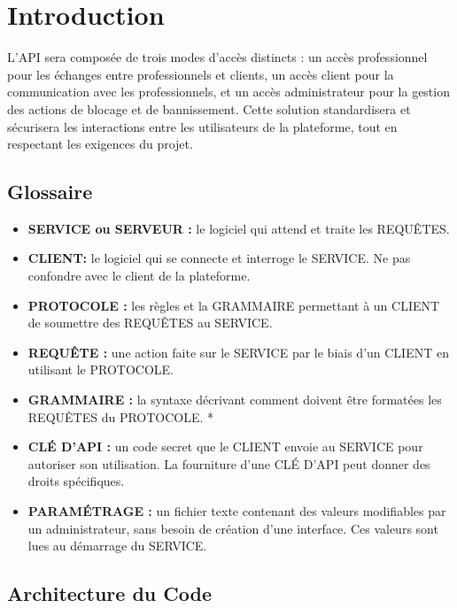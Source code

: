 \documentclass{report}
\begin{document}
\tableofcontents
\newpage
\chapter{Introduction}

L’API sera composée de trois modes d’accès distincts : un accès professionnel pour les échanges entre professionnels et clients, un accès client pour la communication avec les professionnels, et un accès administrateur pour la gestion des actions de blocage et de bannissement. Cette solution standardisera et sécurisera les interactions entre les utilisateurs de la plateforme, tout en respectant les exigences du projet.


\section{Glossaire}

\begin{itemize}
	\item \textbf{SERVICE ou SERVEUR :} le logiciel qui attend et traite les REQUÊTES.
	
	\item \textbf{CLIENT:} le logiciel qui se connecte et interroge le SERVICE. Ne pas confondre avec le client de la plateforme.
	
	\item \textbf{PROTOCOLE :} les règles et la GRAMMAIRE permettant à un CLIENT de soumettre des REQUÊTES au SERVICE. 
	
	\item \textbf{REQUÊTE :} une action faite sur le SERVICE par le biais d’un CLIENT en utilisant le PROTOCOLE.
	
	\item \textbf{GRAMMAIRE : } la syntaxe décrivant comment doivent être formatées les REQUÊTES du PROTOCOLE. *
	
	\item \textbf{CLÉ D’API :}   un code secret  que le CLIENT envoie au SERVICE pour autoriser son utilisation. La fourniture d’une CLÉ D’API peut donner des droits spécifiques. 
	
	\item \textbf{PARAMÉTRAGE :} un fichier texte contenant des valeurs modifiables par un administrateur, sans besoin de création d’une interface. Ces valeurs sont lues au démarrage du SERVICE.
	
\end{itemize}

\section{Architecture du Code}
\end{document}
